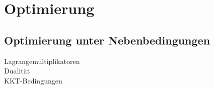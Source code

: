 \section{Optimierung}






\subsection{Optimierung unter Nebenbedingungen}
Lagrangemultiplikatoren\\
Dualität\\
KKT-Bedingungen